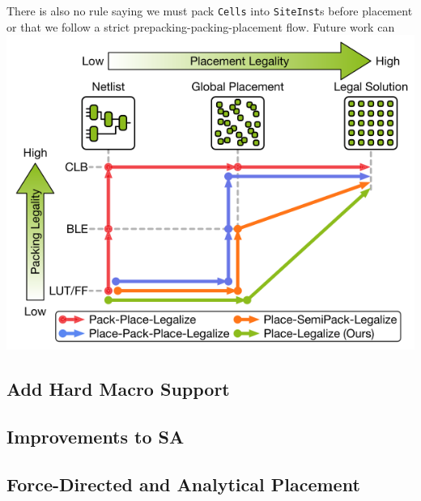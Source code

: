 There is also no rule saying we must pack \texttt{Cells} into \texttt{SiteInst}s before placement or that we follow a strict prepacking-packing-placement flow. 
Future work can 
{
    \centering
    \includegraphics[width=\columnwidth]{figures/future_work/legalization.png}
}
\vspace{0.25cm}

\subsection{Add Hard Macro Support}

\subsection{Improvements to SA}

\subsection{Force-Directed and Analytical Placement}




